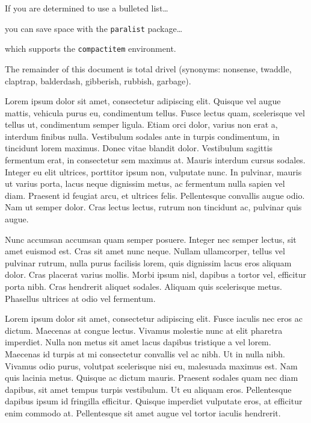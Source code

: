 \documentclass[timesfont,runinheadings]{nsfgrfp}
\begin{document}
\begin{compactitem}

\item
If you are determined to use a bulleted list\ldots

\item
you can save space with the \texttt{paralist} package\ldots

\item
which supports the \texttt{compactitem} environment.

\end{compactitem}

\vspace{0.5ex}

The remainder of this document is total drivel (synonyms: nonsense,
twaddle, claptrap, balderdash, gibberish, rubbish, garbage).

Lorem ipsum dolor sit amet, consectetur adipiscing elit. Quisque vel
augue mattis, vehicula purus eu, condimentum tellus. Fusce lectus quam,
scelerisque vel tellus ut, condimentum semper ligula. Etiam orci dolor,
varius non erat a, interdum finibus nulla. Vestibulum sodales ante in
turpis condimentum, in tincidunt lorem maximus. Donec vitae blandit
dolor. Vestibulum sagittis fermentum erat, in consectetur sem maximus
at. Mauris interdum cursus sodales. Integer eu elit ultrices, porttitor
ipsum non, vulputate nunc. In pulvinar, mauris ut varius porta, lacus
neque dignissim metus, ac fermentum nulla sapien vel diam. Praesent id
feugiat arcu, et ultrices felis. Pellentesque convallis augue odio. Nam
ut semper dolor. Cras lectus lectus, rutrum non tincidunt ac, pulvinar
quis augue.

Nunc accumsan accumsan quam semper posuere. Integer nec semper lectus,
sit amet euismod est. Cras sit amet nunc neque. Nullam ullamcorper,
tellus vel pulvinar rutrum, nulla purus facilisis lorem, quis dignissim
lacus eros aliquam dolor. Cras placerat varius mollis. Morbi ipsum nisl,
dapibus a tortor vel, efficitur porta nibh. Cras hendrerit aliquet
sodales. Aliquam quis scelerisque metus. Phasellus ultrices at odio vel
fermentum.

Lorem ipsum dolor sit amet, consectetur adipiscing elit. Fusce iaculis
nec eros ac dictum. Maecenas at congue lectus. Vivamus molestie nunc at
elit pharetra imperdiet. Nulla non metus sit amet lacus dapibus
tristique a vel lorem. Maecenas id turpis at mi consectetur convallis
vel ac nibh. Ut in nulla nibh. Vivamus odio purus, volutpat scelerisque
nisi eu, malesuada maximus est. Nam quis lacinia metus. Quisque ac
dictum mauris. Praesent sodales quam nec diam dapibus, sit amet tempus
turpis vestibulum. Ut eu aliquam eros. Pellentesque dapibus ipsum id
fringilla efficitur. Quisque imperdiet vulputate eros, at efficitur enim
commodo at. Pellentesque sit amet augue vel tortor iaculis hendrerit.
\end{document}
